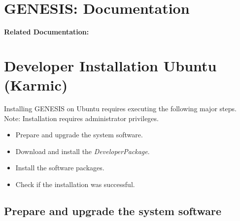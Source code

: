 \documentclass[12pt]{article}
\begin{document}
\section*{GENESIS: Documentation}

{\bf Related Documentation:}

\section*{Developer Installation Ubuntu (Karmic)}

Installing GENESIS on Ubuntu requires executing the following major steps. Note: Installation requires administrator privileges.
\begin{itemize}
   \item[] Prepare and upgrade the system software.
   \item[] Download and install the {\it DeveloperPackage}.
   \item[] Install the software packages.
   \item[] Check if the installation was successful. 
\end{itemize}

\subsection*{Prepare and upgrade the system software}
\end{document}
